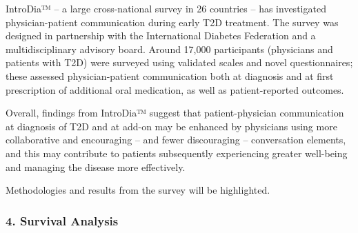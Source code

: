\begin{itemize}
IntroDia™ – a large cross-national survey in 26 countries – has investigated physician-patient communication during early T2D treatment. The survey was designed in partnership with the International Diabetes Federation and a multidisciplinary advisory board. Around 17,000 participants (physicians and patients with T2D) were surveyed using validated scales and novel questionnaires; these assessed physician-patient communication both at diagnosis and at first prescription of additional oral medication, as well as patient-reported outcomes. 

Overall, findings from IntroDia™ suggest that patient-physician communication at diagnosis of T2D and at add-on may be enhanced by physicians using more collaborative and encouraging – and fewer discouraging – conversation elements, and this may contribute to patients subsequently experiencing greater well-being and managing the disease more effectively.

Methodologies and results from the survey will be highlighted.

\end{itemize}

\subsubsection*{4. Survival Analysis}


